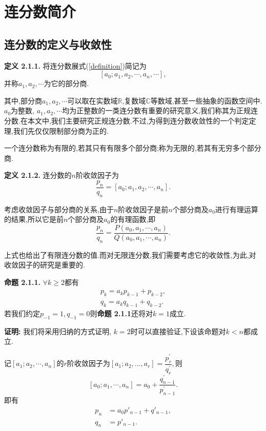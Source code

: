 \section{连分数简介}
\subsection{连分数的定义与收敛性}

\textbf{定义 2.1.1.  }
将连分数展式(\ref{definition})简记为
$$[a_0;a_1,a_2,\cdots,a_n,\cdots],$$
并称$a_1,a_2,\cdots$为它的部分商.\par
\par
其中,部分商$a_1,a_2,\cdots$可以取在实数域$\mathbb{R}$,复数域$\mathbb{C}$等数域,甚至一些抽象的函数空间中. $a_0$为整数, $a_1,a_2,\cdots$均为正整数的一类连分数有重要的研究意义,我们称其为正规连分数.在本文中,我们主要研究正规连分数.不过,为得到连分数收敛性的一个判定定理,我们先仅仅限制部分商为正的.\par
一个连分数称为有限的,若其只有有限多个部分商;称为无限的,若其有无穷多个部分商.\par
\textbf{定义 2.1.2.  }
连分数的$n$阶收敛因子为
$$\frac{p_n}{q_n}=[a_0;a_1,a_2,\cdots,a_n].$$
\par
考虑收敛因子与部分商的关系,由于$n$阶收敛因子是前$n$个部分商及$a_0$进行有理运算的结果,所以它是前$n$个部分商及$a_0$的有理函数,即
$$\frac{p_n}{q_n}=\frac{P(a_0,a_1,\cdots ,a_n)}{Q(a_0,a_1,\cdots ,a_n)}.$$\par
上式也给出了有限连分数的值.而对无限连分数,我们需要考虑它的收敛性,为此,对收敛因子的研究是重要的.\par
\textbf{命题 2.1.1.  }\textsuperscript{\cite{Khinchin}}
$\forall k\geqslant2$都有
\begin{equation}\label{rfc}
    \begin{aligned}
        p_k=a_kp_{k-1}+p_{k-2}, \\
        q_k=a_kq_{k-1}+q_{k-2}.
    \end{aligned}
\end{equation}
若我们约定$p_{-1}=1,q_{-1}=0$则\textbf{命题 2.1.1}还将对$k=1$成立.
\par
\textbf{证明:  }
我们将采用归纳的方式证明, $k=2$时可以直接验证,下设该命题对$k<n$都成立.\par
记$[a_1;a_2,\cdots,a_n]$的$r$阶收敛因子为$[a_1;a_2,\ldots,a_r]=\dfrac{p_r^{'}}{q_r^{'}},$则
$$[a_0;a_1,\cdots,a_n]=a_0+\dfrac{q_{n-1}^{'}}{p_{n-1}^{'}}.$$
即有
\begin{align*}
    p_n & =a_0p'_{n-1}+q'_{n-1}, \\
    q_n & =p'_{n-1}.
\end{align*}
